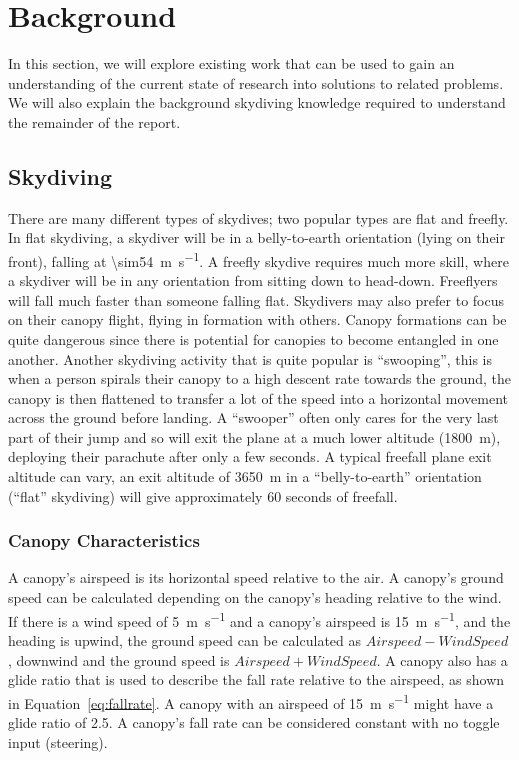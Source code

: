 \section{Background}\label{sec:further-background}
In this section, we will explore existing work that can be used to gain an understanding of the current state of research into solutions to related problems. We will also explain the background skydiving knowledge required to understand the remainder of the report.



\subsection{Skydiving}
There are many different types of skydives; two popular types are flat and freefly. In flat skydiving, a skydiver will be in a belly-to-earth orientation (lying on their front), falling at \SI{\sim54}{\metre\per\second}. A freefly skydive requires much more skill, where a skydiver will be in any orientation from sitting down to head-down. Freeflyers will fall much faster than someone falling flat.
Skydivers may also prefer to focus on their canopy flight, flying in formation with others. Canopy formations can be quite dangerous since there is potential for canopies to become entangled in one another.
Another skydiving activity that is quite popular is ``swooping'', this is when a person spirals their canopy to a high descent rate towards the ground, the canopy is then flattened to transfer a lot of the speed into a horizontal movement across the ground before landing. A ``swooper'' often only cares for the very last part of their jump and so will exit the plane at a much lower altitude (\SI{1800}{\metre}), deploying their parachute after only a few seconds.
A typical freefall plane exit altitude can vary, an exit altitude of \SI{3650}{\metre} in a ``belly-to-earth'' orientation (``flat'' skydiving) will give approximately 60 seconds of freefall.

\subsubsection{Canopy Characteristics}
A canopy's airspeed is its horizontal speed relative to the air.  A canopy's ground speed can be calculated depending on the canopy's heading relative to the wind. If there is a wind speed of \SI{5}{\metre\per\second} and a canopy's airspeed is \SI{15}{\metre\per\second}, and the heading is upwind, the ground speed can be calculated as $Airspeed - WindSpeed$, downwind and the ground speed is $Airspeed + WindSpeed$.
A canopy also has a glide ratio that is used to describe the fall rate relative to the airspeed, as shown in Equation~\ref{eq:fallrate}. A canopy with an airspeed of \SI{15}{\metre\per\second} might have a glide ratio of 2.5. A canopy's fall rate can be considered constant with no toggle input (steering).

